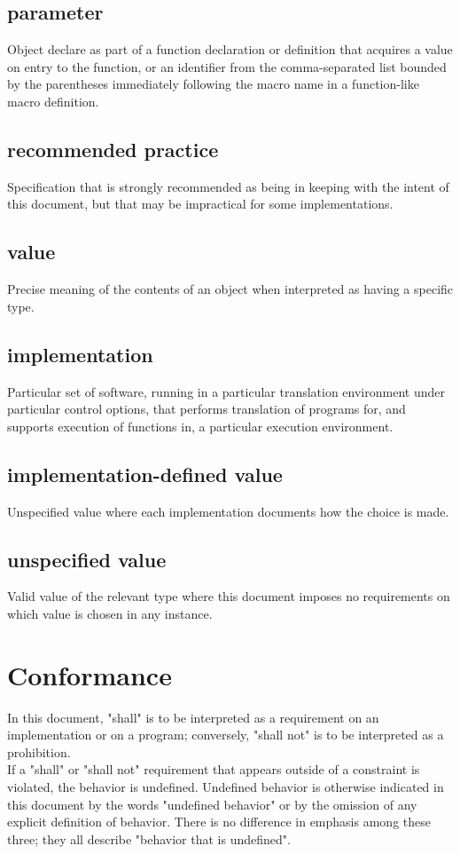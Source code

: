 \documentclass{article}
\begin{document}
\subsection*{parameter}
Object declare as part of a function declaration or definition that acquires a value on
entry to the function, or an identifier from the comma-separated list bounded by the
parentheses immediately following the macro name in a function-like macro definition.

\subsection*{recommended practice}
Specification that is strongly recommended as being in keeping with the intent of this
document, but that may be impractical for some implementations.

\subsection*{value}
Precise meaning of the contents of an object when interpreted as having a specific type.

\subsection*{implementation}
Particular set of software, running in a particular translation environment under
particular control options, that performs translation of programs for, and supports
execution of functions in, a particular execution environment.

\subsection*{implementation-defined value}
Unspecified value where each implementation documents how the choice is made.

\subsection*{unspecified value}
Valid value of the relevant type where this document imposes no requirements on which
value is chosen in any instance.

\section{Conformance}
In this document, "shall" is to be interpreted as a requirement on an implementation
or on a program; conversely, "shall not" is to be interpreted as a prohibition. \\
If a "shall" or "shall not" requirement that appears outside of a constraint is violated,
the behavior is undefined.  Undefined behavior is otherwise indicated in this document by
the words "undefined behavior" or by the omission of any explicit definition of behavior.
There is no difference in emphasis among these three; they all describe "behavior that is
undefined".
\end{document}
